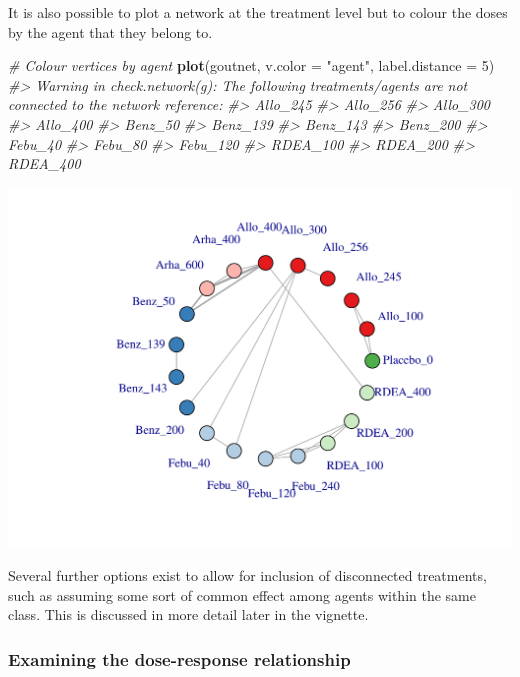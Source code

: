 \documentclass[]{article}
\newenvironment{Shaded}{\begin{snugshade}}{\end{snugshade}}
\newcommand{\CommentTok}[1]{\textcolor[rgb]{0.56,0.35,0.01}{\textit{#1}}}
\newcommand{\DataTypeTok}[1]{\textcolor[rgb]{0.13,0.29,0.53}{#1}}
\newcommand{\DecValTok}[1]{\textcolor[rgb]{0.00,0.00,0.81}{#1}}
\newcommand{\KeywordTok}[1]{\textcolor[rgb]{0.13,0.29,0.53}{\textbf{#1}}}
\newcommand{\NormalTok}[1]{#1}
\newcommand{\StringTok}[1]{\textcolor[rgb]{0.31,0.60,0.02}{#1}}
\begin{document}
It is also possible to plot a network at the treatment level but to
colour the doses by the agent that they belong to.

\begin{Shaded}
\begin{Highlighting}[]
\CommentTok{# Colour vertices by agent}
\KeywordTok{plot}\NormalTok{(goutnet, }\DataTypeTok{v.color =} \StringTok{"agent"}\NormalTok{, }\DataTypeTok{label.distance =} \DecValTok{5}\NormalTok{)}
\CommentTok{#> Warning in check.network(g): The following treatments/agents are not connected to the network reference:}
\CommentTok{#> Allo_245}
\CommentTok{#> Allo_256}
\CommentTok{#> Allo_300}
\CommentTok{#> Allo_400}
\CommentTok{#> Benz_50}
\CommentTok{#> Benz_139}
\CommentTok{#> Benz_143}
\CommentTok{#> Benz_200}
\CommentTok{#> Febu_40}
\CommentTok{#> Febu_80}
\CommentTok{#> Febu_120}
\CommentTok{#> RDEA_100}
\CommentTok{#> RDEA_200}
\CommentTok{#> RDEA_400}
\end{Highlighting}
\end{Shaded}

\includegraphics{mbnmadose_files/figure-latex/unnamed-chunk-11-1.pdf}

Several further options exist to allow for inclusion of disconnected
treatments, such as assuming some sort of common effect among agents
within the same class. This is discussed in more detail later in the
vignette.

\hypertarget{examining-the-dose-response-relationship}{%
\subsubsection{Examining the dose-response
relationship}\label{examining-the-dose-response-relationship}}
\end{document}
